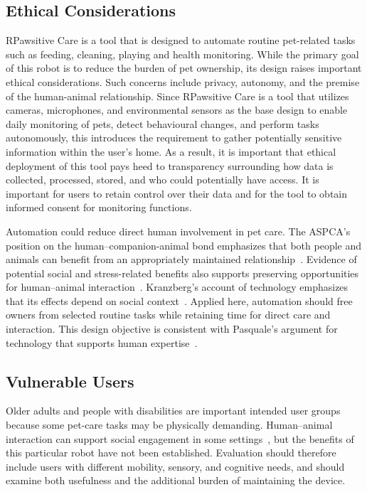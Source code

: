 \documentclass[conference,letterpaper]{IEEEtran}
\begin{document}
\subsection{Ethical Considerations}

RPawsitive Care is a tool that is designed to automate routine pet-related tasks such as feeding, cleaning, playing and health monitoring. While the primary goal of this robot is to reduce the burden of pet ownership, its design raises important ethical considerations. Such concerns include privacy, autonomy, and the premise of the human-animal relationship. Since RPawsitive Care is a tool that utilizes cameras, microphones, and environmental sensors as the base design to enable daily monitoring of pets, detect behavioural changes, and perform tasks autonomously, this introduces the requirement to gather potentially sensitive information within the user’s home. As a result, it is important that ethical deployment of this tool pays heed to transparency surrounding how data is collected, processed, stored, and who could potentially have access. It is important for users to retain control over their data and for the tool to obtain informed consent for monitoring functions.

Automation could reduce direct human involvement in pet care. The ASPCA's position on the human--companion-animal bond emphasizes that both people and animals can benefit from an appropriately maintained relationship~\cite{aspca}. Evidence of potential social and stress-related benefits also supports preserving opportunities for human--animal interaction~\cite{beetz}. Kranzberg's account of technology emphasizes that its effects depend on social context~\cite{kranzberg}. Applied here, automation should free owners from selected routine tasks while retaining time for direct care and interaction. This design objective is consistent with Pasquale's argument for technology that supports human expertise~\cite{pasquale}.

\subsection{Vulnerable Users}

Older adults and people with disabilities are important intended user groups because some pet-care tasks may be physically demanding. Human--animal interaction can support social engagement in some settings~\cite{beetz}, but the benefits of this particular robot have not been established. Evaluation should therefore include users with different mobility, sensory, and cognitive needs, and should examine both usefulness and the additional burden of maintaining the device.
\end{document}
